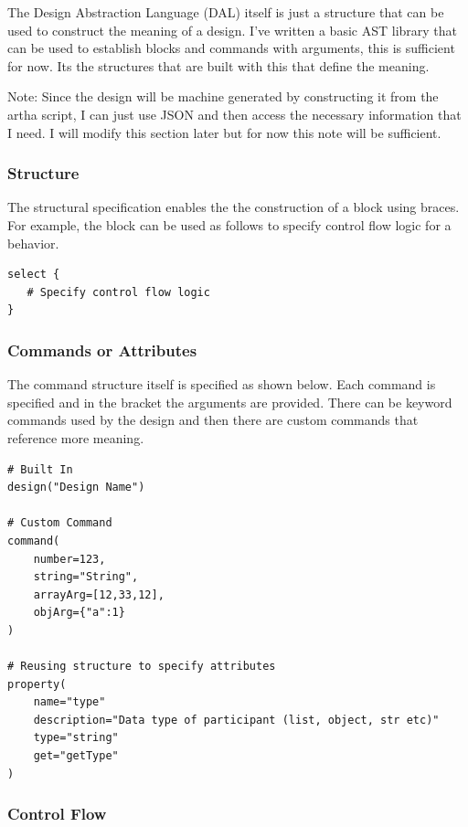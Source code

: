 The Design Abstraction Language (DAL) itself is just a structure that can be used to construct the meaning of a design. I've written a basic AST library that can be used to establish blocks and commands with arguments, this is sufficient for now. Its the structures that are built with this that define the meaning.

Note: Since the design will be machine generated by constructing it from the artha script, I can just use JSON and then access the necessary information that I need. I will modify this section later but for now this note will be sufficient.
\subsubsection{Structure}

The structural specification enables the the construction of a block using braces. For example, the block can be used as follows to specify control flow logic for a behavior.

\begin{verbatim}
select {
   # Specify control flow logic
}
\end{verbatim}

\subsubsection{Commands or Attributes}

The command structure itself is specified as shown below. Each command is specified and in the bracket the arguments are provided. There can be keyword commands used by the design and then there are custom commands that reference more meaning.

\begin{verbatim}
# Built In
design("Design Name")

# Custom Command
command(
    number=123, 
    string="String", 
    arrayArg=[12,33,12], 
    objArg={"a":1}
)

# Reusing structure to specify attributes
property(
    name="type"
    description="Data type of participant (list, object, str etc)"
    type="string"
    get="getType"
)
\end{verbatim}

\subsubsection{Control Flow}


